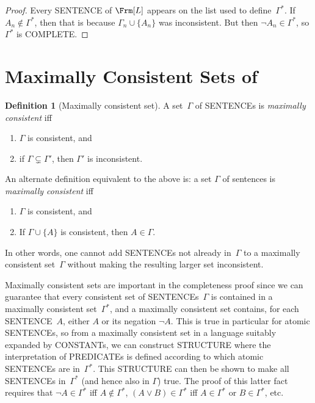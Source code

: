 \documentclass[10pt,a4paper]{article}
\newcommand*{\olup}[1]{\MakeUppercase{#1}}
\theoremstyle{plain}
\theoremstyle{definition}
\newtheorem{defn}[thm]{Definition}
\theoremstyle{remark}
\newenvironment{explain}{}{}
\newcommand*{\olfileid}[3]{}
\newcommand*{\olsection}[1]{\section*{#1}}
\newcommand*{\ollabel}[1]{\label{#1}}
\begin{document}
\begin{proof}
Every \olup{sentence} of $\Frm[L]$ appears on the list used to
define~$\Gamma^*$. If $A_n \notin \Gamma^*$, then that is because
$\Gamma_n \cup \{A_n\}$ was inconsistent.  But then $\lnot A_n
\in \Gamma^*$, so $\Gamma^*$ is \olup{complete}.
\end{proof}






\olfileid{fol}{com}{mcs}
\olsection{Maximally Consistent Sets of }

\begin{defn}[Maximally consistent set]
\ollabel{mcs}
A set~$\Gamma$ of \olup{sentence}s is \emph{maximally consistent} iff
\begin{enumerate}
\item $\Gamma$ is consistent, and
\item if $\Gamma \subsetneq \Gamma'$, then $\Gamma'$ is inconsistent.
\end{enumerate}
\end{defn}

\begin{explain}
An alternate definition equivalent to the above is: a set $\Gamma$ of
sentences is \emph{maximally consistent} iff
\begin{enumerate}
\item $\Gamma$ is consistent, and
\item If $\Gamma \cup \{ A \}$ is consistent, then $A \in \Gamma$.
\end{enumerate}
In other words, one cannot add \olup{sentence}s not already in~$\Gamma$
to a maximally consistent set~$\Gamma$ without making the resulting
larger set inconsistent.
\end{explain}

\begin{explain}
Maximally consistent sets are important in the completeness proof
since we can guarantee that every consistent set of \olup{sentence}s~$\Gamma$
is contained in a maximally consistent set~$\Gamma^*$, and a maximally
consistent set contains, for each \olup{sentence}~$A$, either $A$ or its
negation $\lnot A$. This is true in particular for atomic \olup{sentence}s,
so from a maximally consistent set in a language suitably expanded by
\olup{constant}s, we can construct \olup{structure} where the
interpretation of \olup{predicate}s is defined according to which atomic
\olup{sentence}s are in~$\Gamma^*$. This \olup{structure} can then be shown to
make all \olup{sentence}s in~$\Gamma^*$ (and hence also in $\Gamma$)
true. The proof of this latter fact requires that $\lnot A \in
\Gamma^*$ iff $A \notin \Gamma^*$, $(A \lor B) \in \Gamma^*$ iff $A
\in \Gamma^*$ or $B \in \Gamma^*$, etc.
\end{explain}
\end{document}
